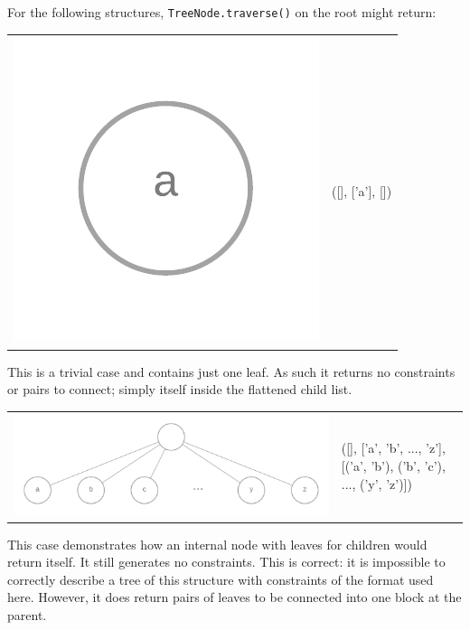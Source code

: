 \documentclass[11pt]{article} %
\begin{document}
For the following structures, \texttt{TreeNode.traverse()} on the root might return:
\begin{center}
\begin{tabular}{>{\centering}m{} >{\centering\arraybackslash}m{}}
	\includegraphics[scale=0.2]{traverse1} & ([], ['a'], [])
\end{tabular}
\end{center}
This is a trivial case and contains just one leaf. As such it returns no constraints or pairs to connect; simply itself inside the flattened child list.

\begin{center}
\begin{tabular}{>{\centering}m{} >{\centering\arraybackslash}m{}}
	\includegraphics[scale=0.1]{traverse2} & ([], ['a', 'b', ..., 'z'], [('a', 'b'), ('b', 'c'), ..., ('y', 'z')])
\end{tabular}
\end{center}
This case demonstrates how an internal node with leaves for children would return itself. It still generates no constraints. This is correct: it is impossible to correctly describe a tree of this structure with constraints of the format used here. However, it does return pairs of leaves to be connected into one block at the parent.
\end{document}
